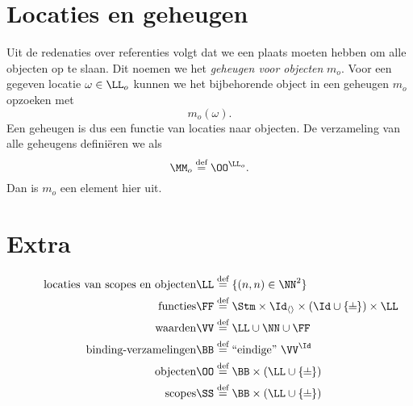 \section{Locaties en geheugen}\label{sec:locaties}

Uit de redenaties over referenties volgt dat we een plaats moeten hebben om alle objecten op te slaan. Dit noemen we het \emph{geheugen voor objecten} $m_o$. Voor een gegeven locatie $\omega\in\LL_o$ kunnen we het bijbehorende object in een geheugen $m_o$ opzoeken met
\begin{equation*}
  m_o(\omega).
\end{equation*}
Een geheugen is dus een functie van locaties naar objecten. De verzameling van alle geheugens definiëren we als
\begin{equation*}
  \MM_o \DEF \OO^{\LL_o}.
\end{equation*}
Dan is $m_o$ een element hier uit.

\section*{Extra}

\begin{align*}
  \tag*{locaties van scopes en objecten}
  \LL &\DEF \{ (n, n) \in \NN^2 \} \\
  \tag*{functies}
  \FF &\DEF \Stm \times \Id_{\langle\rangle} \times (\Id \cup \{\nil\}) \times \LL \\
  \tag*{waarden}
  \VV &\DEF \LL \cup \NN \cup \FF \\
  \tag*{binding-verzamelingen}
  \BB &\DEF \FiniteFunctions{\VV}{\Id} \\
  \tag*{objecten}
  \OO &\DEF \BB \times (\LL \cup \{\nil\}) \\
  \tag*{scopes}
  \SS &\DEF \BB \times (\LL \cup \{\nil\}) \\
\end{align*}

